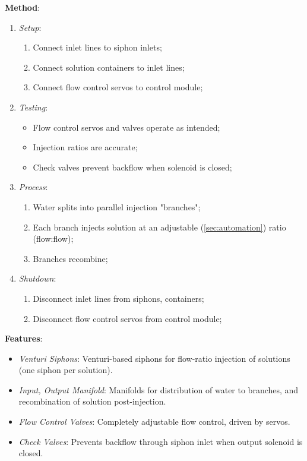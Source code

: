 \documentclass{../tex/report}
\begin{document}
\textbf{Method}:
\begin{enumerate}
    \item \textit{Setup}:
    \begin{enumerate}
        \item Connect inlet lines to siphon inlets;
        \item Connect solution containers to inlet lines;
        \item Connect flow control servos to control module;
    \end{enumerate}
    \item \textit{Testing}:
    \begin{itemize}
        \item Flow control servos and valves operate as intended;
        \item Injection ratios are accurate;
        \item Check valves prevent backflow when solenoid is closed;
    \end{itemize}
    \item \textit{Process}:
    \begin{enumerate}
        \item Water splits into parallel injection "branches";
        \item Each branch injects solution at an adjustable (\ref{sec:automation}) ratio (flow:flow);
        \item Branches recombine;
    \end{enumerate}
    \item \textit{Shutdown}:
    \begin{enumerate}
        \item Disconnect inlet lines from siphons, containers;
        \item Disconnect flow control servos from control module;
    \end{enumerate}
\end{enumerate}

\textbf{Features}:
\begin{itemize}
    \item \textit{Venturi Siphons}: Venturi-based siphons for flow-ratio injection of solutions (one siphon per solution).
    \item \textit{Input, Output Manifold}: Manifolds for distribution of water to branches, and recombination of solution post-injection.
    \item \textit{Flow Control Valves}: Completely adjustable flow control, driven by servos.
    \item \textit{Check Valves}: Prevents backflow through siphon inlet when output solenoid is closed.
\end{itemize}
\end{document}

